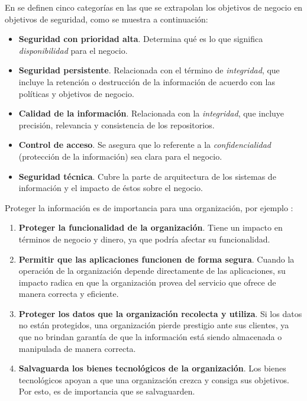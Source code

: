\vspace{0.3cm}

En \cite{Ace1709} se definen cinco categorías en las que se extrapolan los objetivos de negocio en objetivos de seguridad, como se muestra a continuación:

\begin{itemize}[noitemsep]
	\item \textbf{Seguridad con prioridad alta}. Determina qué es lo que significa \textit{disponibilidad} para el negocio.
	\item \textbf{Seguridad persistente}. Relacionada con el término de \textit{integridad}, que incluye la retención o destrucción de la información de acuerdo con las políticas y objetivos de negocio.
	\item \textbf{Calidad de la información}. Relacionada con la \textit{integridad}, que incluye precisión, relevancia y consistencia de los repositorios. 
	\item \textbf{Control de acceso}. Se asegura que lo referente a la \textit{confidencialidad} (protección de la información) sea clara para el negocio. 
	\item \textbf{Seguridad técnica}. Cubre la parte de arquitectura de los sistemas de información y el impacto de éstos sobre el negocio. 
\end{itemize}



Proteger la información es de importancia para una organización, por ejemplo \cite{WhiMat12}: 

\begin{enumerate}[noitemsep]
	\item \textbf{Proteger la funcionalidad de la organización}. Tiene un impacto en términos de negocio y dinero, ya que podría afectar su funcionalidad.
	\item \textbf{Permitir que las aplicaciones funcionen de forma segura}. Cuando la operación de la organización depende directamente de las aplicaciones, su impacto radica en que la organización provea del servicio que ofrece de manera correcta y eficiente.
	\item \textbf{Proteger los datos que la organización recolecta y utiliza}. Si los datos no están protegidos, una organización pierde prestigio ante sus clientes, ya que no brindan garantía de que la información está siendo almacenada o manipulada de manera correcta. 
	\item \textbf{Salvaguarda los bienes tecnológicos de la organización}. Los bienes tecnológicos apoyan a que una organización crezca y consiga sus objetivos. Por esto, es de importancia que se salvaguarden. 
\end{enumerate}


